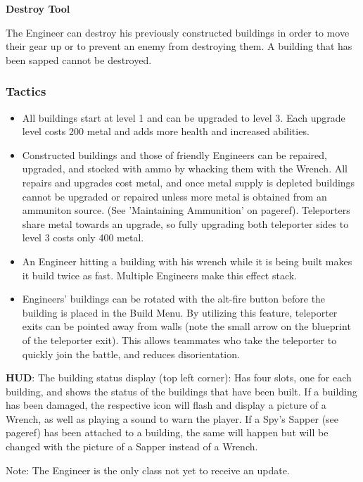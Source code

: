 {\bf Destroy Tool}

 The Engineer can destroy his previously constructed buildings in order to move their gear up or to prevent an enemy from destroying them. A building that has been sapped cannot be destroyed.


\subsubsection {Tactics}
\begin {itemize}

\item All buildings start at level 1 and can be upgraded to level 3.  Each upgrade level costs 200 metal and adds more health and increased abilities.

\item Constructed buildings and those of friendly Engineers can be repaired, upgraded, and stocked with ammo by whacking them with the Wrench.  All repairs and upgrades cost metal, and once metal supply is depleted buildings cannot be upgraded or repaired unless more metal is obtained from an ammuniton source.  (See 'Maintaining Ammunition' on {{pageref}}). Teleporters share metal towards an upgrade, so fully upgrading both teleporter sides to level 3 costs only 400 metal.

\item An Engineer hitting a building with his wrench while it is being built makes it build twice as fast. Multiple Engineers make this effect stack.

\item Engineers' buildings can be rotated with the alt-fire button before the building is placed in the Build Menu. By utilizing this feature, teleporter exits can be pointed away from walls (note the small arrow on the blueprint of the teleporter exit). This allows teammates who take the teleporter to quickly join the battle, and reduces disorientation.
\end {itemize}
{\bf HUD}:
The building status display (top left corner): Has four slots, one for each building, and shows the status of the buildings that have been built. If a building has been damaged, the respective icon will  flash and display a picture of a Wrench, as well as playing a sound to warn the player. If a Spy's Sapper (see {{pageref}}) has been attached to a building, the same will happen but will be changed with the picture of a Sapper instead of a Wrench.
 
Note: The Engineer is the only class not yet to receive an update.
